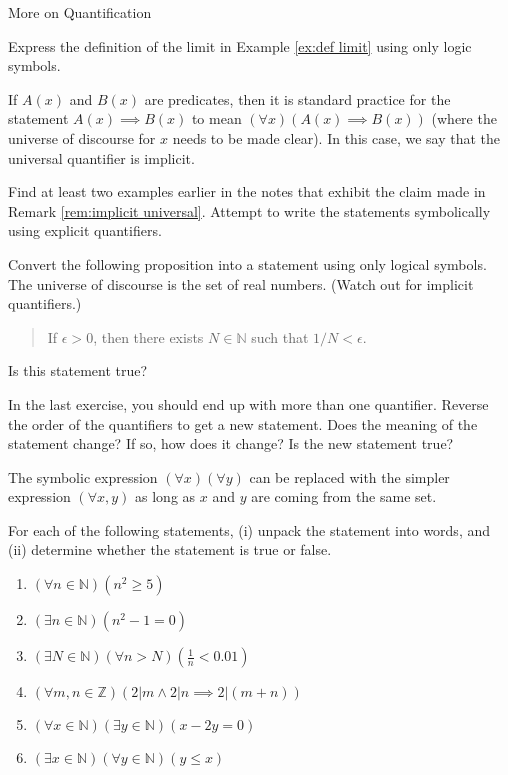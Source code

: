 \begin{section}{More on Quantification}
\begin{exercise}
Express the definition of the limit in Example \ref{ex:def limit} using only logic symbols.
\end{exercise}

\begin{remark}\label{rem:implicit universal}
If $A(x)$ and $B(x)$ are predicates, then it is standard practice for the statement $A(x)\implies B(x)$ to mean $(\forall x)(A(x)\implies B(x))$ (where the universe of discourse for $x$ needs to be made clear).  In this case, we say that the universal quantifier is implicit.
\end{remark}

\begin{exercise}
Find at least two examples earlier in the notes that exhibit the claim made in Remark \ref{rem:implicit universal}.  Attempt to write the statements symbolically using explicit quantifiers.
\end{exercise}

\begin{exercise}
Convert the following proposition into a statement using only logical symbols.  The universe of discourse is the set of real numbers.  (Watch out for implicit quantifiers.)
\begin{quote}
If $\epsilon >0$, then there exists $N\in\mathbb{N}$ such that $1/N<\epsilon$.
\end{quote}
Is this statement true?
\end{exercise}

\begin{exercise}
In the last exercise, you should end up with more than one quantifier.  Reverse the order of the quantifiers to get a new statement.  Does the meaning of the statement change?  If so, how does it change?  Is the new statement true?
\end{exercise}

\begin{remark}
The symbolic expression $(\forall x)(\forall y)$ can be replaced with the simpler expression $(\forall x,y)$ as long as $x$ and $y$ are coming from the same set.
\end{remark}

\begin{exercise}
For each of the following statements, (i) unpack the statement into words, and (ii) determine whether the statement is true or false.

\begin{enumerate}
\item $(\forall n \in \mathbb{N})(n^2 \geq 5)$
\item $(\exists n \in \mathbb{N})(n^2-1=0)$
\item $(\exists N \in \mathbb{N})(\forall  n > N)(\frac{1}{n} < 0.01)$
\item $(\forall m, n \in \mathbb{Z})(2|m \wedge 2|n \implies 2|(m+n))$
\item $(\forall x \in \mathbb{N})(\exists y \in \mathbb{N})(x-2y=0)$
\item $(\exists x \in \mathbb{N})(\forall y \in \mathbb{N})(y \leq x)$
\end{enumerate}
\end{exercise}


\end{section}

